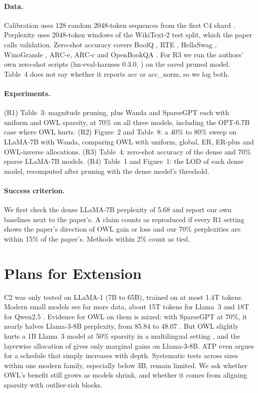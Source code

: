 \documentclass[11pt]{article}
\begin{document}
\paragraph{Data.} Calibration uses 128 random 2048-token sequences from the first C4 shard \citep{raffel2020c4}. Perplexity uses 2048-token windows of the WikiText-2 \citep{merity2017wikitext} test split, which the paper calls validation. Zero-shot accuracy covers BoolQ \citep{clark2019boolq}, RTE \citep{wang2018glue}, HellaSwag \citep{zellers2019hellaswag}, WinoGrande \citep{sakaguchi2021winogrande}, ARC-e, ARC-c \citep{clark2018arc} and OpenBookQA \citep{mihaylov2018obqa}. For R3 we run the authors' own zero-shot scripts (lm-eval-harness 0.3.0, \citealp{gao2024lmeval}) on the saved pruned model. Table~4 does not say whether it reports acc or acc\_norm, so we log both.

\paragraph{Experiments.} (R1) Table~3: magnitude pruning, plus Wanda and SparseGPT each with uniform and OWL sparsity, at 70\% on all three models, including the OPT-6.7B case where OWL hurts. (R2) Figure~2 and Table~8: a 40\% to 80\% sweep on LLaMA-7B with Wanda, comparing OWL with uniform, global, ER, ER-plus and OWL-inverse allocations. (R3) Table~4: zero-shot accuracy of the dense and 70\% sparse LLaMA-7B models. (R4) Table~1 and Figure~1: the LOD of each dense model, recomputed after pruning with the dense model's threshold.

\paragraph{Success criterion.} We first check the dense LLaMA-7B perplexity of 5.68 and report our own baselines next to the paper's. A claim counts as reproduced if every R1 setting shows the paper's direction of OWL gain or loss and our 70\% perplexities are within 15\% of the paper's. Methods within 2\% count as tied.

\section{Plans for Extension}

C2 was only tested on LLaMA-1 (7B to 65B), trained on at most 1.4T tokens. Modern small models see far more data, about 15T tokens for Llama~3 \citep{grattafiori2024llama3} and 18T for Qwen2.5 \citep{qwen2025qwen25}. Evidence for OWL on them is mixed: with SparseGPT at 70\%, it nearly halves Llama-3-8B perplexity, from 85.84 to 48.07 \citep{sieberling2025evopress}. But OWL slightly hurts a 1B Llama~3 model at 50\% sparsity in a multilingual setting \citep{choenni2025mwanda}, and the layerwise allocation of \citet{jamshidi2026pals} gives only marginal gains on Llama-3-8B. ATP \citep{huang2025atp} even argues for a schedule that simply increases with depth. Systematic tests across sizes within one modern family, especially below 3B, remain limited. We ask whether OWL's benefit still grows as models shrink, and whether it comes from aligning sparsity with outlier-rich blocks.
\end{document}
